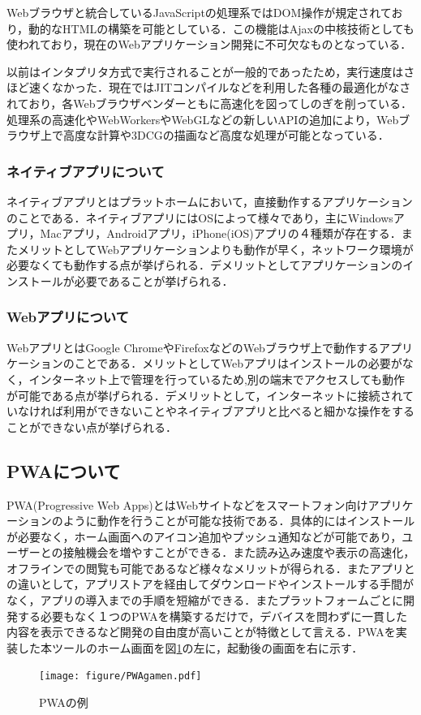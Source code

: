 \documentclass[a4j,12pt]{jarticle}
\begin{document}
Webブラウザと統合しているJavaScriptの処理系ではDOM操作が規定されており，動的なHTMLの構築を可能としている．この機能はAjaxの中核技術としても使われており，現在のWebアプリケーション開発に不可欠なものとなっている．

以前はインタプリタ方式で実行されることが一般的であったため，実行速度はさほど速くなかった．現在ではJITコンパイルなどを利用した各種の最適化がなされており，各Webブラウザベンダーともに高速化を図ってしのぎを削っている．
処理系の高速化やWebWorkersやWebGLなどの新しいAPIの追加により，Webブラウザ上で高度な計算や3DCGの描画など高度な処理が可能となっている\cite{ren9}．

\subsubsection{ネイティブアプリについて}
ネイティブアプリとはプラットホームにおいて，直接動作するアプリケーションのことである．ネイティブアプリにはOSによって様々であり，主にWindowsアプリ，Macアプリ，Androidアプリ，iPhone(iOS)アプリの４種類が存在する．またメリットとしてWebアプリケーションよりも動作が早く，ネットワーク環境が必要なくても動作する点が挙げられる．デメリットとしてアプリケーションのインストールが必要であることが挙げられる．


\subsubsection{Webアプリについて}
WebアプリとはGoogle ChromeやFirefoxなどのWebブラウザ上で動作するアプリケーションのことである．メリットとしてWebアプリはインストールの必要がなく，インターネット上で管理を行っているため,別の端末でアクセスしても動作が可能である点が挙げられる．デメリットとして，インターネットに接続されていなければ利用ができないことやネイティブアプリと比べると細かな操作をすることができない点が挙げられる．
\newpage
\subsection{PWAについて}
PWA(Progressive Web Apps)とはWebサイトなどをスマートフォン向けアプリケーションのように動作を行うことが可能な技術である．具体的にはインストールが必要なく，ホーム画面へのアイコン追加やプッシュ通知などが可能であり，ユーザーとの接触機会を増やすことができる．また読み込み速度や表示の高速化，オフラインでの閲覧も可能であるなど様々なメリットが得られる．またアプリとの違いとして，アプリストアを経由してダウンロードやインストールする手間がなく，アプリの導入までの手順を短縮ができる．またプラットフォームごとに開発する必要もなく１つのPWAを構築するだけで，デバイスを問わずに一貫した内容を表示できるなど開発の自由度が高いことが特徴として言える\cite{ren6}．PWAを実装した本ツールのホーム画面を図\ref{fig:f}の左に，起動後の画面を右に示す．
\begin{figure}[h]
\begin{center}
 \texttt{[image: figure/PWAgamen.pdf]}
\end{center}
 \caption{PWAの例}
 \label{fig:f}
\end{figure}
\newpage
\end{document}
